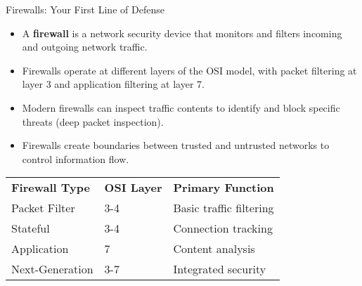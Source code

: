 \documentclass{beamer}
\begin{document}
\begin{frame}{Firewalls: Your First Line of Defense}
    \begin{itemize}
        \item A \textbf{firewall} is a network security device that monitors and filters incoming and outgoing network traffic.
        \item Firewalls operate at different layers of the OSI model, with packet filtering at layer 3 and application filtering at layer 7.
        \item Modern firewalls can inspect traffic contents to identify and block specific threats (deep packet inspection).
        \item Firewalls create boundaries between trusted and untrusted networks to control information flow.
    \end{itemize}
    
    \begin{table}
    \begin{tabular}{lll}
    \textbf{Firewall Type} & \textbf{OSI Layer} & \textbf{Primary Function} \\
    Packet Filter & 3-4 & Basic traffic filtering \\
    Stateful & 3-4 & Connection tracking \\
    Application & 7 & Content analysis \\
    Next-Generation & 3-7 & Integrated security \\
    \end{tabular}
    \end{table}
    \end{frame}
    
\end{document}
